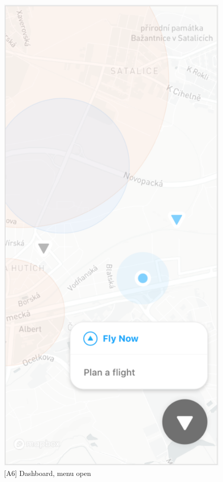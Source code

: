 \begin{figure}
    \centering
    \begin{minipage}{.45\textwidth}
        \centering
        \includegraphics[width=.7\linewidth]{assets/user_interface_design/dashboard/dashboard_menu_open.png}
        \caption[menu open]{[A6] Dashboard, menu open}
        \label{fig:dashboard_menu_open}
    \end{minipage}%
    \hspace{.05\linewidth}
    \begin{minipage}{.45\textwidth}
        \centering

\end{minipage}
\end{figure}
